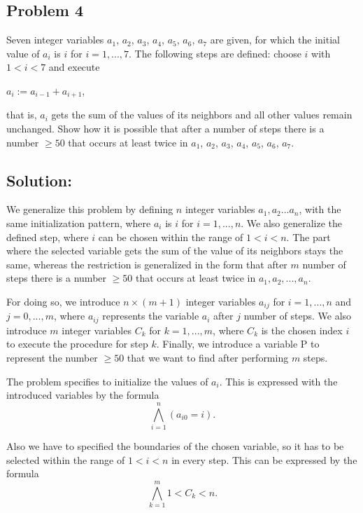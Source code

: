 \subsection*{Problem 4}

Seven integer variables $a_{1}$, $a_{2}$, $a_{3}$, $a_{4}$, $a_{5}$, $a_{6}$, $a_{7}$ are given, for which the initial value of $a_{i}$ is $i$ for $i = 1, . . . , 7$. The following steps are defined: choose $i$ with $1 < i < 7$ and execute
\begin{center}
$a_{i} := a_{i - 1} + a_{i+1}$,\\
\end{center}
that is, $a_{i}$ gets the sum of the values of its neighbors and all other values remain unchanged. Show how it is possible that after a number of steps there is a number $\geq 50$ that occurs at least twice in $a_{1}$, $a_{2}$, $a_{3}$, $a_{4}$, $a_{5}$, $a_{6}$, $a_{7}$.
\vspace{4mm}

\subsection*{Solution:}

We generalize this problem by defining $n$ integer variables $a_{1}, a_{2} . . . a_{n}$, with the same initialization pattern, where $a_{i}$ is $i$ for $i = 1, . . . , n$. We also generalize the defined step, where $i$ can be chosen within the range of $1 < i < n$. The part where the selected variable gets the sum of the value of its neighbors stays the same, whereas the restriction is generalized in the form that after $m$ number of steps there is a number $\geq 50$ that occurs at least twice in $a_{1}, a_{2}, . . . , a_{n}$.

For doing so, we introduce $n\times (m+1)$ integer variables $a_{ij}$ for $i = 1, . . . , n$ and $j = 0, . . . , m$, where $a_{ij}$ represents the variable $a_{i}$ after $j$ number of steps. We also introduce $m$ integer variables $C_k$ for $k = 1, . . . , m$, where $C_k$ is the chosen index $i$ to execute the procedure for step $k$. Finally, we introduce a variable P to represent the number $\geq 50$ that we want to find after performing $m$ steps.

The problem specifies to initialize the values of $a_i$. This is expressed with the introduced variables by the formula
\[ \bigwedge_{i=1}^n (a_{i0} = i).\]

Also we have to specified the boundaries of the chosen variable, so it has to be selected within the range of $1 < i < n$ in every step. This can be expressed by the formula
\[ \bigwedge_{k=1}^m 1<C_k<n.\]

